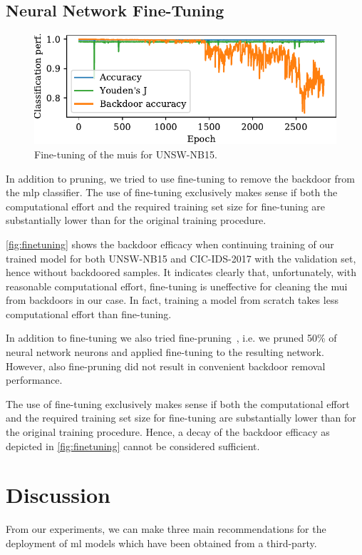 \documentclass[10pt,sigconf,letterpaper,dvipsnames]{acmart}
\newcommand\note[2]{{\color{#1}#2}}
\newcommand\todo[1]{{\note{red}{TODO: #1}}}
\newcommand{\unsw}{UNSW-NB15}
\newcommand{\cic}{CIC-IDS-2017}
\begin{document}
\subsection{Neural Network Fine-Tuning}
\begin{figure}[t]
\includegraphics[width=\columnwidth]{figures/finetuning_2017.pdf}
\caption{Fine-tuning of the \glspl{mui} for \unsw{}.}
\label{fig:finetuning}
\end{figure}
In addition to pruning, we tried to use fine-tuning to remove the backdoor from the \gls{mlp} classifier.
The use of fine-tuning exclusively makes  sense if both the computational effort and the required training set size for fine-tuning are substantially lower than for the original training procedure. 

\autoref{fig:finetuning} shows the backdoor efficacy when continuing training of our trained model for both \unsw{} and \cic{} with the validation set, hence without backdoored samples.
It indicates clearly that, unfortunately, with reasonable computational effort, fine-tuning is uneffective for cleaning the \gls{mui} from backdoors in our case. In fact, training a model from scratch takes less computational effort than fine-tuning.

In addition to fine-tuning we also tried fine-pruning~\cite{liu_fine-pruning:_2018}, i.e. we pruned 50\% of neural network neurons and applied fine-tuning to the resulting network. However, also fine-pruning did not result in convenient backdoor removal performance.

The use of fine-tuning exclusively makes  sense if both the computational effort and the required training set size for fine-tuning are substantially lower than for the original training procedure. Hence, a decay of the backdoor efficacy as depicted in \autoref{fig:finetuning} cannot be considered sufficient.

\section{Discussion}
From our experiments, we can make three main recommendations for the deployment of \gls{ml} models which have been obtained from a third-party.
\end{document}
